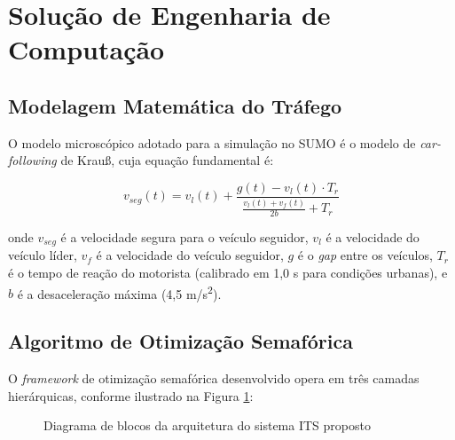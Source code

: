 \documentclass[12pt,a4paper,oneside]{abntex2}
\begin{document}
\section{Solução de Engenharia de Computação}

\subsection{Modelagem Matemática do Tráfego}

O modelo microscópico adotado para a simulação no SUMO é o modelo de \textit{car-following} de Krauß, cuja equação fundamental é:

\begin{equation}
v_{seg}(t) = v_l(t) + \frac{g(t) - v_l(t) \cdot T_r}{\frac{v_l(t) + v_f(t)}{2b} + T_r}
\label{eq:krauss}
\end{equation}

onde $v_{seg}$ é a velocidade segura para o veículo seguidor, $v_l$ é a velocidade do veículo líder, $v_f$ é a velocidade do veículo seguidor, $g$ é o \textit{gap} entre os veículos, $T_r$ é o tempo de reação do motorista (calibrado em 1,0 s para condições urbanas), e $b$ é a desaceleração máxima (4,5 m/s\textsuperscript{2}).

\subsection{Algoritmo de Otimização Semafórica}

O \textit{framework} de otimização semafórica desenvolvido opera em três camadas hierárquicas, conforme ilustrado na Figura \ref{fig:arquitetura}:

\begin{figure}[H]
\centering
{}
\caption{Diagrama de blocos da arquitetura do sistema ITS proposto}
\label{fig:arquitetura}
\end{figure}
\end{document}
